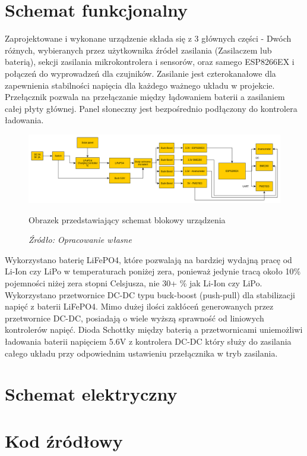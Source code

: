 \documentclass[12pt,a4paper,oneside]{memoir}
\begin{document}
\chapter{Schemat funkcjonalny}
\par Zaprojektowane i wykonane urządzenie składa się z 3 głównych części - Dwóch różnych, wybieranych przez użytkownika źródeł zasilania (Zasilaczem lub baterią), sekcji zasilania mikrokontrolera i sensorów, oraz samego ESP8266EX i połączeń do wyprowadzeń dla czujników. Zasilanie jest czterokanałowe dla zapewnienia stabilności napięcia dla każdego ważnego układu w projekcie. Przełącznik pozwala na przełączanie między łądowaniem baterii a zasilaniem całej płyty głównej. Panel słoneczny jest bezpośrednio podłączony do kontrolera ładowania. 
\begin{figure}[!h]
	\centering
	\includegraphics[scale=0.35]{images/block-schematic.png}
	{\tytulyrozdzialow \footnotesize \caption[Schemat blokowy] {Obrazek przedstawiający schemat blokowy urządzenia}}
	\caption*{\textit{Źródło: Opracowanie własne}}
\end{figure}
\par Wykorzystano baterię LiFePO4, które pozwalają na bardziej wydajną pracę od Li-Ion czy LiPo w temperaturach poniżej zera, ponieważ jedynie tracą około 10\% pojemności niżej zera stopni Celsjusza, nie 30+ \% jak Li-Ion czy LiPo. Wykorzystano przetwornice DC-DC typu buck-boost (push-pull) dla stabilizacji napięć z baterii LiFePO4. Mimo dużej ilości zakłóceń generowanych przez przetwornice DC-DC, posiadają o wiele wyższą sprawność od liniowych kontrolerów napięć. Dioda Schottky między baterią a przetwornicami uniemożliwi ładowania baterii napięciem 5.6V z kontrolera DC-DC który służy do zasilania całego układu przy odpowiednim ustawieniu przełącznika w tryb zasilania.
\newpage
\chapter{Schemat elektryczny}

\newpage
\chapter{Kod źródłowy} 
\end{document}
